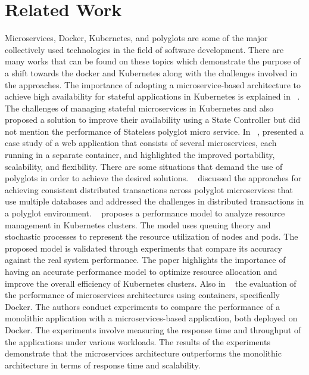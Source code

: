 \section{Related Work}
Microservices, Docker, Kubernetes, and polyglots are some of the major collectively used technologies in the field of software development. There are many works that can be found on these topics which demonstrate the purpose of a shift towards the docker and Kubernetes along with the challenges involved in the approaches. The importance of adopting a microservice-based architecture to achieve high availability for stateful applications in Kubernetes is explained in    ~\cite{vayghan2019microservice}. The challenges of managing stateful microservices in Kubernetes and also proposed a solution to improve their availability using a State Controller but did not mention the performance of Stateless polyglot micro service. In ~\cite{sharma2020docker}, presented a case study of a web application that consists of several microservices, each running in a separate container, and highlighted the  improved portability, scalability, and flexibility. There are some situations that demand the use of polyglots in order to achieve the desired solutions. ~\cite{zhang2019grit} discussed the approaches for achieving consistent distributed transactions across polyglot microservices that use multiple databases and addressed the challenges in distributed transactions in a polyglot environment. ~\cite{medel2016modelling} proposes a performance model to analyze resource management in Kubernetes clusters. The model uses queuing theory and stochastic processes to represent the resource utilization of nodes and pods. The proposed model is validated through experiments that compare its accuracy against the real system performance. The paper highlights the importance of having an accurate performance model to optimize resource allocation and improve the overall efficiency of Kubernetes clusters. Also in ~\cite{amaral2015performance} the evaluation of the performance of microservices architectures using containers, specifically Docker. The authors conduct experiments to compare the performance of a monolithic application with a microservices-based application, both deployed on Docker. The experiments involve measuring the response time and throughput of the applications under various workloads. The results of the experiments demonstrate that the microservices architecture outperforms the monolithic architecture in terms of response time and scalability. 

